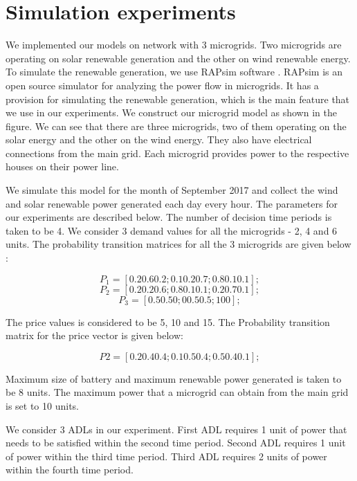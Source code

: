 \section{Simulation experiments}
We implemented our models on network with 3 microgrids. Two microgrids are operating on solar renewable generation and the other on wind renewable energy. To simulate the renewable generation, we use RAPsim software \cite{rapsim}. RAPsim is an open source simulator for analyzing the power flow in microgrids. It has a provision for simulating the renewable generation, which is the main feature that we use in our experiments. We construct our microgrid model as shown in the figure. We can see that there are three microgrids, two of them operating on the solar energy and the other on the wind energy. They also have electrical connections from the main grid. Each microgrid provides power to the respective houses on their power line. 


We simulate this model for the month of September 2017 and collect the wind and solar renewable power generated each day every hour. The parameters for our experiments are described below. The number of decision time periods is taken to be 4. We consider 3 demand values for all the microgrids - 2, 4 and 6 units. The probability transition matrices for all the 3 microgrids are given below :

$$
P_{1} = [0.2 0.6 0.2;0.1 0.2 0.7;0.8 0.1 0.1]; $$
$$
P_{2} = [0.2 0.2 0.6;0.8 0.1 0.1;0.2 0.7 0.1]; $$
$$P_{3} = [0.5 0.5 0;0 0.5 0.5;1 0 0];$$

The price values is considered to be 5, 10 and 15. The Probability transition matrix for the price vector is given below:

$$ P2 = [0.2 0.4 0.4;0.1 0.5 0.4;0.5 0.4 0.1];$$

Maximum size of battery and maximum renewable power generated is taken to be 8 units. The maximum power that a microgrid can obtain from the main grid is set to 10 units.

We consider 3 ADLs in our experiment. First ADL requires 1 unit of power that needs to be satisfied within the second time period. Second ADL requires 1 unit of power within the third time period. Third ADL requires 2 units of power within the fourth time period. 

